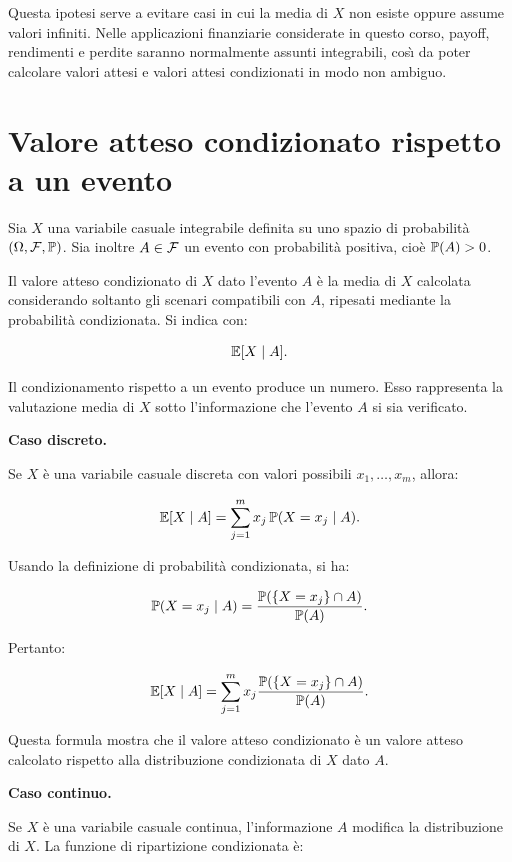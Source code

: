 Questa ipotesi serve a evitare casi in cui la media di $X$ non esiste oppure
assume valori infiniti. Nelle applicazioni finanziarie considerate in questo
corso, payoff, rendimenti e perdite saranno normalmente assunti integrabili,
cos\`{\i} da poter calcolare valori attesi e valori attesi condizionati in
modo non ambiguo.

\section{Valore atteso condizionato rispetto a un evento}

Sia $X$ una variabile casuale integrabile definita su uno spazio di probabilit\`{a}
$(\Omega,\mathcal{F},\mathbb{P})$. Sia inoltre $A\in\mathcal{F}$ un evento
con probabilit\`{a} positiva, cio\`{e} $\mathbb{P}(A)>0$.

Il valore atteso condizionato di $X$ dato l'evento $A$ \`{e} la media di $X$
calcolata considerando soltanto gli scenari compatibili con $A$, ripesati
mediante la probabilit\`{a} condizionata. Si indica con:

\[
\mathbb{E}[X\mid A].
\]

Il condizionamento rispetto a un evento produce un numero. Esso rappresenta la
valutazione media di $X$ sotto l'informazione che l'evento $A$ si sia
verificato.

\medskip

\noindent
\textbf{Caso discreto.}

Se $X$ \`{e} una variabile casuale discreta con valori possibili
$x_1,\ldots,x_m$, allora:

\[
\mathbb{E}[X\mid A]
=
\sum_{j=1}^{m}
x_j\,\mathbb{P}(X=x_j\mid A).
\]

Usando la definizione di probabilit\`{a} condizionata, si ha:

\[
\mathbb{P}(X=x_j\mid A)
=
\frac{
\mathbb{P}(\{X=x_j\}\cap A)
}{
\mathbb{P}(A)
}.
\]

Pertanto:

\[
\mathbb{E}[X\mid A]
=
\sum_{j=1}^{m}
x_j
\frac{
\mathbb{P}(\{X=x_j\}\cap A)
}{
\mathbb{P}(A)
}.
\]

Questa formula mostra che il valore atteso condizionato \`{e} un valore atteso
calcolato rispetto alla distribuzione condizionata di $X$ dato $A$.

\medskip

\noindent
\textbf{Caso continuo.}

Se $X$ \`{e} una variabile casuale continua, l'informazione $A$ modifica la
distribuzione di $X$. La funzione di ripartizione condizionata \`{e}:


